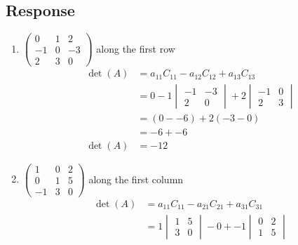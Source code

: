 \documentclass[13pt]{article}
\begin{document}
    \subsection*{Response}
    \begin{enumerate}[label=(\alph*),leftmargin=*]
    \item $
      \begin{pmatrix}
        0 & 1 & 2 \\
        -1 & 0 & -3 \\
        2 & 3 & 0
      \end{pmatrix}
      $ along the first row
      \begin{align*}
        \det(A) &= a_{11}C_{11} - a_{12}C_{12} + a_{13}C_{13} \\
                &= 0 - 1
                  \begin{vmatrix}
                    -1 & -3 \\
                    2 & 0
                  \end{vmatrix} + 2
                  \begin{vmatrix}
                    -1 & 0 \\
                    2 & 3
                  \end{vmatrix} \\
                &= (0 - -6) + 2(-3 - 0) \\
                &= -6 + -6 \\
        \det(A)  &= -12
      \end{align*}
    \item $
      \begin{pmatrix}
        1 & 0 & 2 \\
        0 & 1 & 5 \\
        -1 & 3 & 0
      \end{pmatrix}
      $ along the first column
      \begin{align*}
        \det(A) &= a_{11}C_{11} - a_{21}C_{21} + a_{31}C_{31} \\
                &= 1
                  \begin{vmatrix}
                    1 & 5 \\
                    3 & 0
                  \end{vmatrix} - 0 + -1
                  \begin{vmatrix}
                    0 & 2 \\
                    1 & 5
                  \end{vmatrix} \\

\end{align*}
\end{enumerate}
\end{document}
